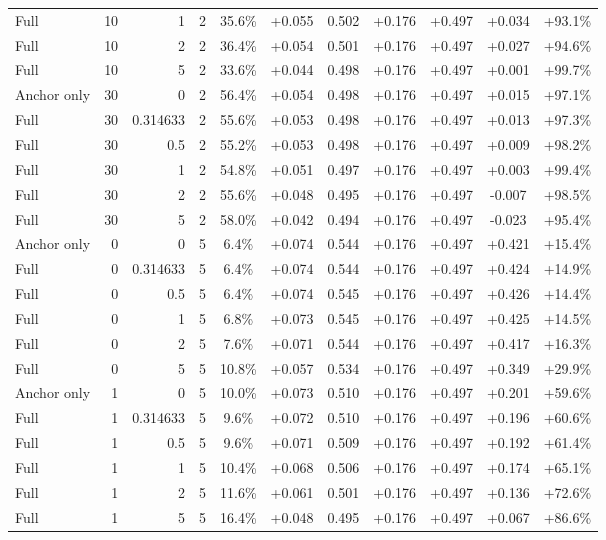 \begin{table}[htbp]
\begin{tabular}{lrrrccccccc}
Full & 10 & 1 & 2 & 35.6\% & +0.055 & 0.502 & +0.176 & +0.497 & +0.034 & +93.1\% \\
Full & 10 & 2 & 2 & 36.4\% & +0.054 & 0.501 & +0.176 & +0.497 & +0.027 & +94.6\% \\
Full & 10 & 5 & 2 & 33.6\% & +0.044 & 0.498 & +0.176 & +0.497 & +0.001 & +99.7\% \\
Anchor only & 30 & 0 & 2 & 56.4\% & +0.054 & 0.498 & +0.176 & +0.497 & +0.015 & +97.1\% \\
Full & 30 & 0.314633 & 2 & 55.6\% & +0.053 & 0.498 & +0.176 & +0.497 & +0.013 & +97.3\% \\
Full & 30 & 0.5 & 2 & 55.2\% & +0.053 & 0.498 & +0.176 & +0.497 & +0.009 & +98.2\% \\
Full & 30 & 1 & 2 & 54.8\% & +0.051 & 0.497 & +0.176 & +0.497 & +0.003 & +99.4\% \\
Full & 30 & 2 & 2 & 55.6\% & +0.048 & 0.495 & +0.176 & +0.497 & -0.007 & +98.5\% \\
Full & 30 & 5 & 2 & 58.0\% & +0.042 & 0.494 & +0.176 & +0.497 & -0.023 & +95.4\% \\
Anchor only & 0 & 0 & 5 & 6.4\% & +0.074 & 0.544 & +0.176 & +0.497 & +0.421 & +15.4\% \\
Full & 0 & 0.314633 & 5 & 6.4\% & +0.074 & 0.544 & +0.176 & +0.497 & +0.424 & +14.9\% \\
Full & 0 & 0.5 & 5 & 6.4\% & +0.074 & 0.545 & +0.176 & +0.497 & +0.426 & +14.4\% \\
Full & 0 & 1 & 5 & 6.8\% & +0.073 & 0.545 & +0.176 & +0.497 & +0.425 & +14.5\% \\
Full & 0 & 2 & 5 & 7.6\% & +0.071 & 0.544 & +0.176 & +0.497 & +0.417 & +16.3\% \\
Full & 0 & 5 & 5 & 10.8\% & +0.057 & 0.534 & +0.176 & +0.497 & +0.349 & +29.9\% \\
Anchor only & 1 & 0 & 5 & 10.0\% & +0.073 & 0.510 & +0.176 & +0.497 & +0.201 & +59.6\% \\
Full & 1 & 0.314633 & 5 & 9.6\% & +0.072 & 0.510 & +0.176 & +0.497 & +0.196 & +60.6\% \\
Full & 1 & 0.5 & 5 & 9.6\% & +0.071 & 0.509 & +0.176 & +0.497 & +0.192 & +61.4\% \\
Full & 1 & 1 & 5 & 10.4\% & +0.068 & 0.506 & +0.176 & +0.497 & +0.174 & +65.1\% \\
Full & 1 & 2 & 5 & 11.6\% & +0.061 & 0.501 & +0.176 & +0.497 & +0.136 & +72.6\% \\
Full & 1 & 5 & 5 & 16.4\% & +0.048 & 0.495 & +0.176 & +0.497 & +0.067 & +86.6\% \\

\end{tabular}
\end{table}
